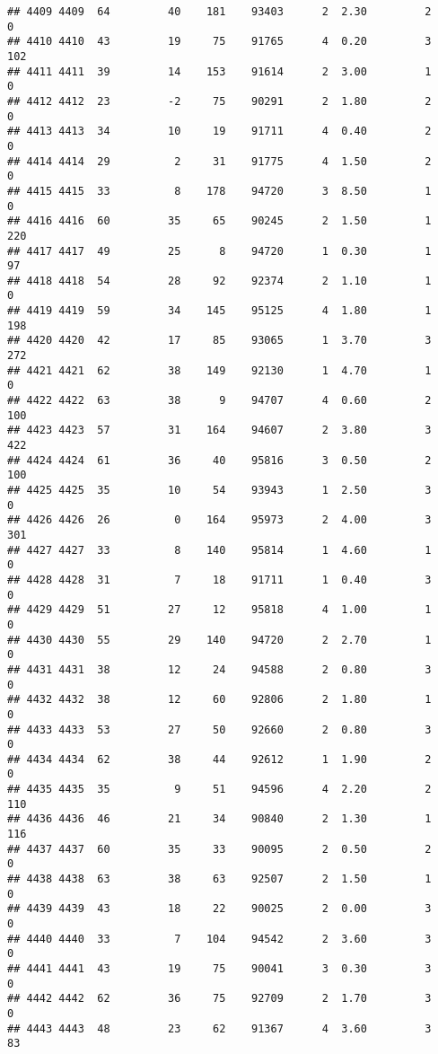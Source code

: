 \documentclass[
]{article}
\begin{document}
\begin{verbatim}
## 4409 4409  64         40    181    93403      2  2.30         2        0
## 4410 4410  43         19     75    91765      4  0.20         3      102
## 4411 4411  39         14    153    91614      2  3.00         1        0
## 4412 4412  23         -2     75    90291      2  1.80         2        0
## 4413 4413  34         10     19    91711      4  0.40         2        0
## 4414 4414  29          2     31    91775      4  1.50         2        0
## 4415 4415  33          8    178    94720      3  8.50         1        0
## 4416 4416  60         35     65    90245      2  1.50         1      220
## 4417 4417  49         25      8    94720      1  0.30         1       97
## 4418 4418  54         28     92    92374      2  1.10         1        0
## 4419 4419  59         34    145    95125      4  1.80         1      198
## 4420 4420  42         17     85    93065      1  3.70         3      272
## 4421 4421  62         38    149    92130      1  4.70         1        0
## 4422 4422  63         38      9    94707      4  0.60         2      100
## 4423 4423  57         31    164    94607      2  3.80         3      422
## 4424 4424  61         36     40    95816      3  0.50         2      100
## 4425 4425  35         10     54    93943      1  2.50         3        0
## 4426 4426  26          0    164    95973      2  4.00         3      301
## 4427 4427  33          8    140    95814      1  4.60         1        0
## 4428 4428  31          7     18    91711      1  0.40         3        0
## 4429 4429  51         27     12    95818      4  1.00         1        0
## 4430 4430  55         29    140    94720      2  2.70         1        0
## 4431 4431  38         12     24    94588      2  0.80         3        0
## 4432 4432  38         12     60    92806      2  1.80         1        0
## 4433 4433  53         27     50    92660      2  0.80         3        0
## 4434 4434  62         38     44    92612      1  1.90         2        0
## 4435 4435  35          9     51    94596      4  2.20         2      110
## 4436 4436  46         21     34    90840      2  1.30         1      116
## 4437 4437  60         35     33    90095      2  0.50         2        0
## 4438 4438  63         38     63    92507      2  1.50         1        0
## 4439 4439  43         18     22    90025      2  0.00         3        0
## 4440 4440  33          7    104    94542      2  3.60         3        0
## 4441 4441  43         19     75    90041      3  0.30         3        0
## 4442 4442  62         36     75    92709      2  1.70         3        0
## 4443 4443  48         23     62    91367      4  3.60         3       83

\end{verbatim}
\end{document}
